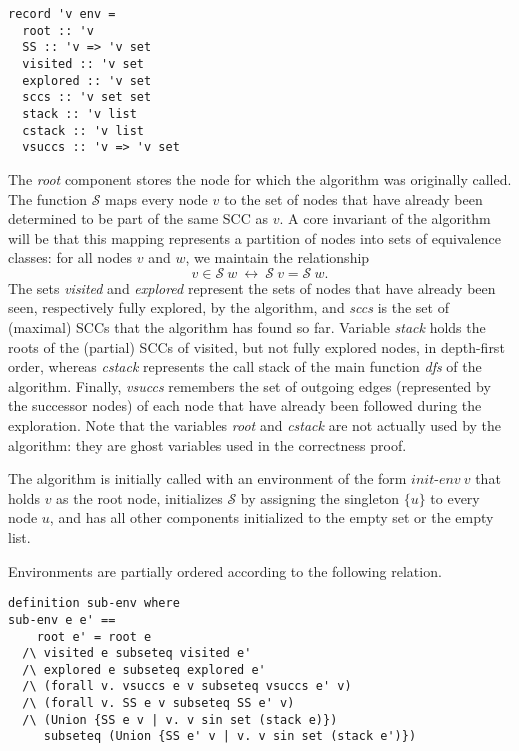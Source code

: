 \documentclass[sigplan,10pt,anonymous,review]{acmart}
\newcommand{\prog}[1]{\textit{#1}}
\renewcommand{\SS}{\mathcal{S}}
\begin{document}
\begin{small}
\begin{lstlisting}[language=isabelle]
record 'v env =
  root :: 'v
  SS :: 'v => 'v set
  visited :: 'v set
  explored :: 'v set
  sccs :: 'v set set
  stack :: 'v list
  cstack :: 'v list
  vsuccs :: 'v => 'v set
\end{lstlisting}
\end{small}

The \prog{root} component stores the node for which the algorithm was originally called.
The function $\SS$ maps every node $v$ to the set of nodes that have already been determined to be part of the same SCC as $v$.
A core invariant of the algorithm will be that this mapping represents a partition of nodes into sets of equivalence classes: for all nodes $v$ and $w$, we maintain the relationship
\[
  v \in \SS~w\ \longleftrightarrow\ \SS~v = \SS~w.
\]
The sets \prog{visited} and \prog{explored} represent the sets of nodes that have already been seen, respectively fully explored, by the algorithm, and \prog{sccs} is the set of (maximal) SCCs that the algorithm has found so far. Variable \prog{stack} holds the roots of the (partial) SCCs of visited, but not fully explored nodes, in depth-first order, whereas \prog{cstack} represents the call stack of the main function \prog{dfs} of the algorithm. Finally, \prog{vsuccs} remembers the set of outgoing edges (represented by the successor nodes) of each node that have already been followed during the exploration. Note that the variables \prog{root} and \prog{cstack} are not actually used by the algorithm: they are ghost variables used in the correctness proof.

The algorithm is initially called with an environment of the form $\prog{init-env}~v$ that holds $v$ as the root node, initializes $\SS$ by assigning the singleton $\{u\}$ to every node $u$, and has all other components initialized to the empty set or the empty list.

Environments are partially ordered according to the following relation.

\begin{small}
\begin{lstlisting}[language=isabelle]
definition sub-env where
sub-env e e' ==
    root e' = root e
  /\ visited e subseteq visited e'
  /\ explored e subseteq explored e'
  /\ (forall v. vsuccs e v subseteq vsuccs e' v)
  /\ (forall v. SS e v subseteq SS e' v)
  /\ (Union {SS e v | v. v sin set (stack e)})
     subseteq (Union {SS e' v | v. v sin set (stack e')})
\end{lstlisting}
\end{small}
\end{document}
